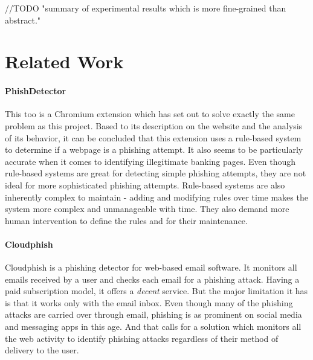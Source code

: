 \documentclass[conference]{IEEEtran}
\begin{document}
\par //TODO  "summary of experimental results which is more fine-grained than abstract."

\section{Related Work}
\paragraph{PhishDetector\cite{PhishDetector}}
This too is a Chromium extension which has set out to solve exactly the same problem as this project.
Based to its description on the website and the analysis of its behavior, it can be concluded that this extension uses a rule-based system to determine if a webpage is a phishing attempt.
It also seems to be particularly accurate when it comes to identifying illegitimate banking pages.
Even though rule-based systems are great for detecting simple phishing attempts, they are not ideal for more sophisticated phishing attempts.
Rule-based systems are also inherently complex to maintain - adding and modifying rules over time makes the system more complex and unmanageable with time.
They also demand more human intervention to define the rules and for their maintenance.

\paragraph{Cloudphish\cite{Cloudphish}}
Cloudphish is a phishing detector for web-based email software.
It monitors all emails received by a user and checks each email for a phishing attack.
Having a paid subscription model, it offers a \emph{decent} service.
But the major limitation it has is that it works only with the email inbox.
Even though many of the phishing attacks are carried over through email, phishing is as prominent on social media and messaging apps in this age.
And that calls for a solution which monitors all the web activity to identify phishing attacks regardless of their method of delivery to the user.
\end{document}
